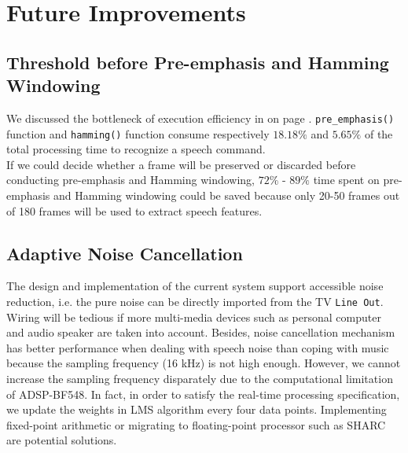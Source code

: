 
\section{Future Improvements}

\subsection{Threshold before Pre-emphasis and Hamming Windowing}

We discussed the bottleneck of execution efficiency in  on page \pageref{subsection:statistical-profiling}. \texttt{pre\_emphasis()} function and \texttt{hamming()} function consume respectively $18.18\%$ and $5.65\%$ of the total processing time to recognize a speech command.\\

If we could decide whether a frame will be preserved or discarded before conducting pre-emphasis and Hamming windowing, $72\%$ - $89\%$ time spent on pre-emphasis and Hamming windowing could be saved because only 20-50 frames out of 180 frames will be used to extract speech features.


\subsection{Adaptive Noise Cancellation}

The design and implementation of the current system support accessible noise reduction, i.e. the pure noise can be directly imported from the TV \texttt{Line Out}. Wiring will be tedious if more multi-media devices such as personal computer and audio speaker are taken into account. Besides, noise cancellation mechanism has better performance when dealing with speech noise than coping with music because the sampling frequency (16 kHz) is not high enough. However, we cannot increase the sampling frequency disparately due to the computational limitation of ADSP-BF548. In fact, in order to satisfy the real-time processing specification, we update the weights in LMS algorithm every four data points. Implementing fixed-point arithmetic or migrating to floating-point processor such as SHARC\textsuperscript{\textregistered} are potential solutions.

